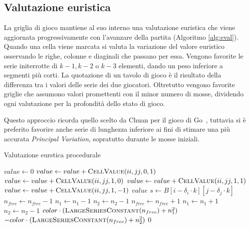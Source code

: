\documentclass{article}
\begin{document}
\subsection*{Valutazione euristica}

La griglia di gioco mantiene al suo interno una valutazione euristica che viene
aggiornata progressivamente con l'avanzare della partita (Algoritmo \vref{alg:eval}).
Quando una cella viene marcata si valuta la variazione del valore euristico osservando
le righe, colonne e diaginali che passano per essa. Vengono favorite le serie initerrotte
di $k-1, k-2$ o $k-3$ elementi, dando un peso inferiore a segmenti pi\`u corti.
La quotazione di un tavolo di gioco \`e il risultato della differenza tra i
valori delle serie dei due giocatori. Oltretutto vengono favorite griglie che
assumono valori promettenti con il minor numero di mosse, dividendo ogni
valutazione per la profondit\`a dello stato di gioco.

Questo approccio ricorda quello scelto da Chuan per il gioco di Go~\cite{chuan},
tuttavia si \`e preferito favorire anche serie di lunghezza inferiore ai fini di
stimare una pi\`u accurata \emph{Principal Variation}, sopratutto durante le
mosse iniziali.

\begin{algorithm}
  \caption{Valutazione eurstica procedurale}
  \label{alg:eval}
  \begin{algorithmic}[0]
      \State $value \gets 0$
        \State $value \gets value + \Call{CellValue}{ii, jj, 0, 1}$
      \EndFor
        \State $value \gets value + \Call{CellValue}{ii, jj, 1, 0}$
      \EndFor
        \State $value \gets value + \Call{CellValue}{ii, jj, 1, 1}$
      \EndFor
        \State $value \gets value + \Call{CellValue}{ii, jj, 1, -1}$
      \EndFor
      \State \Return $value$
    \EndProcedure
    \Statex
       
        \State $s \gets B[i - \delta_i \cdot k][j - \delta_j \cdot k]$ 
          \State $n_{free} \gets n_{free} - 1$
          \State $n_1 \gets n_1 - 1$
        \Else
          \State $n_2 \gets n_2 - 1$
        \EndIf
      \EndIf
        \State $n_{free} \gets n_{free} + 1$
        \State $n_1 \gets n_1 + 1$
      \Else {}
        \State $n_2 \gets n_2 - 1$
      \EndIf
      \Statex
        \State \Return $color \cdot (\Call{LargeSeriesConstant}{n_{free}} + n_1^2)$
        \State \Return $-color \cdot (\Call{LargeSeriesConstant}{n_{free}} + n_2^2)$
      \Else
        \State \Return $0$
      \EndIf
    \EndProcedure
  \end{algorithmic}
\end{algorithm}
\end{document}
